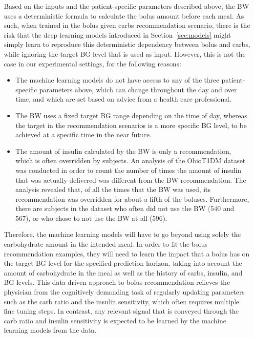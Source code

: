 Based on the inputs and the patient-specific parameters described above, the \ac{BW} uses a deterministic formula to calculate the bolus amount before each meal. As such, when trained in the bolus given carbs recommendation scenario, there is the risk that the deep learning models introduced in Section~\ref{sec:models} might simply learn to reproduce this deterministic dependency between bolus and carbs, while ignoring the target \ac{BG} level that is used as input. However, this is not the case in our experimental settings, for the following reasons:
\begin{itemize}
    \item The machine learning models do not have access to any of the three patient-specific parameters above, which can change throughout the day and over time, and which are set based on advice from a health care professional.
    \item The \ac{BW} uses a fixed target \ac{BG} range depending on the time of day, whereas the target in the recommendation scenarios is a more specific \ac{BG} level, to be achieved at a specific time in the near future.
    \item The amount of insulin calculated by the \ac{BW} is only a recommendation, which is often overridden by subjects. An analysis of the OhioT1DM dataset was conducted in order to count the number of times the amount of insulin that was actually delivered was different from the BW recommendation. The analysis revealed that, of all the times that the \ac{BW} was used, its recommendation was overridden for about a fifth of the boluses. Furthermore, there are subjects in the dataset who often did not use the \ac{BW} (540 and 567), or who 
    chose to not use the \ac{BW} at all (596).
\end{itemize}
Therefore, the machine learning models will have to go beyond using solely the carbohydrate amount in the intended meal. In order to fit the bolus recommendation examples, they will need to learn the impact that a bolus has on the target \ac{BG} level for the specified prediction horizon, taking into account the amount of carbohydrate in the meal as well as the history of carbs, insulin, and \ac{BG} levels. This data driven approach to bolus recommendation relieves the physician from the cognitively demanding task of regularly updating parameters such as the carb ratio and the insulin sensitivity, which often requires multiple fine tuning steps. In contrast, any relevant signal that is conveyed through the carb ratio and insulin sensitivity is expected to be learned by the machine learning models from the data.


